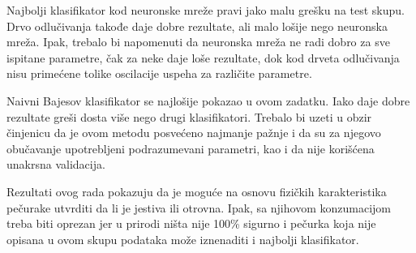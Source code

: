 \documentclass[a4paper]{article}
\begin{document}
Najbolji klasifikator kod neuronske mreže pravi jako malu grešku na test skupu. Drvo odlučivanja takođe daje dobre rezultate, ali malo lošije nego neuronska mreža. Ipak, trebalo bi napomenuti da neuronska mreža ne radi dobro za sve ispitane parametre, čak za neke daje loše rezultate, dok kod drveta odlučivanja nisu primećene tolike oscilacije uspeha za različite parametre.

Naivni Bajesov klasifikator se najlošije pokazao u ovom zadatku. Iako daje dobre rezultate greši dosta više nego drugi klasifikatori. Trebalo bi uzeti u obzir činjenicu da je ovom metodu posvećeno najmanje pažnje i da su za njegovo obučavanje upotrebljeni podrazumevani parametri, kao i da nije korišćena unakrsna validacija.

Rezultati ovog rada pokazuju da je moguće na osnovu fizičkih karakteristika pečurake utvrditi da li je jestiva ili otrovna. Ipak, sa njihovom konzumacijom treba biti oprezan jer u prirodi ništa nije 100\% sigurno i pečurka koja nije opisana u ovom skupu podataka može iznenaditi i najbolji klasifikator.


\appendix
 

\end{document}
